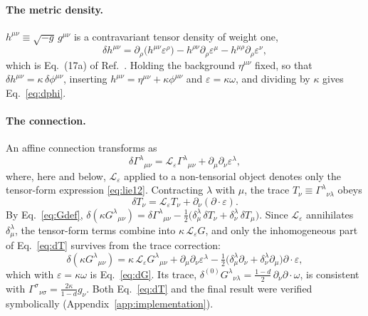\documentclass[prd,aps,preprint,superscriptaddress,nofootinbib,amsmath,amssymb,eqsecnum]{revtex4-2}
\begin{document}
\paragraph{The metric density.} $h^{\mu\nu}\equiv\sqrt{-g}\,g^{\mu\nu}$ is a contravariant
tensor density of weight one,
\begin{equation}
\delta h^{\mu\nu}=\partial_\rho\big(h^{\mu\nu}\varepsilon^\rho\big)
-h^{\rho\nu}\partial_\rho\varepsilon^\mu-h^{\mu\rho}\partial_\rho\varepsilon^\nu ,
\label{eq:dh}
\end{equation}
which is Eq.~(17a) of Ref.~\cite{BrandtMcKeon2015}. Holding the background $\eta^{\mu\nu}$
fixed, so that $\delta h^{\mu\nu}=\kappa\,\delta\phi^{\mu\nu}$, inserting
$h^{\mu\nu}=\eta^{\mu\nu}+\kappa\phi^{\mu\nu}$ and $\varepsilon=\kappa\omega$, and dividing by
$\kappa$ gives Eq.~\eqref{eq:dphi}.

\paragraph{The connection.} An affine connection transforms as
\begin{equation}
\delta\Gamma^{\lambda}{}_{\mu\nu}=\mathcal{L}_\varepsilon\Gamma^{\lambda}{}_{\mu\nu}
+\partial_\mu\partial_\nu\varepsilon^\lambda ,
\label{eq:dGamma}
\end{equation}
where, here and below, $\mathcal{L}_\varepsilon$ applied to a non-tensorial object denotes
only the tensor-form expression \eqref{eq:lie12}. Contracting $\lambda$ with $\mu$, the
trace $T_\nu\equiv\Gamma^{\lambda}{}_{\nu\lambda}$ obeys
\begin{equation}
\delta T_\nu=\mathcal{L}_\varepsilon T_\nu+\partial_\nu(\partial\!\cdot\!\varepsilon).
\label{eq:dT}
\end{equation}
By Eq.~\eqref{eq:Gdef},
$\delta(\kappa G^{\lambda}{}_{\mu\nu})=\delta\Gamma^{\lambda}{}_{\mu\nu}
-\tfrac12\big(\delta^\lambda_\mu\,\delta T_\nu+\delta^\lambda_\nu\,\delta T_\mu\big)$. Since
$\mathcal{L}_\varepsilon$ annihilates $\delta^\lambda_\mu$, the tensor-form terms combine into
$\kappa\,\mathcal{L}_\varepsilon G$, and only the inhomogeneous part of Eq.~\eqref{eq:dT}
survives from the trace correction:
\begin{equation}
\delta(\kappa G^{\lambda}{}_{\mu\nu})=\kappa\,\mathcal{L}_\varepsilon G^{\lambda}{}_{\mu\nu}
+\partial_\mu\partial_\nu\varepsilon^\lambda
-\tfrac12\big(\delta^\lambda_\mu\partial_\nu+\delta^\lambda_\nu\partial_\mu\big)\partial\!\cdot\!\varepsilon ,
\end{equation}
which with $\varepsilon=\kappa\omega$ is Eq.~\eqref{eq:dG}. Its trace,
$\delta^{(0)}G^{\lambda}{}_{\nu\lambda}=\tfrac{1-d}{2}\,\partial_\nu\partial\!\cdot\!\omega$,
is consistent with $\Gamma^{\sigma}{}_{\nu\sigma}=\frac{2\kappa}{1-d}g_\nu$. Both
Eq.~\eqref{eq:dT} and the final result were verified symbolically
(Appendix~\ref{app:implementation}).
\end{document}
